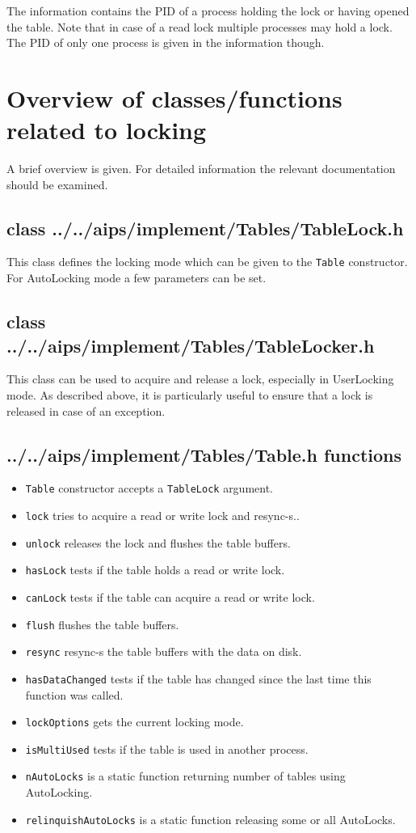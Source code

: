 The information contains the PID of a process holding the lock or
having opened the table. Note that in case of a read lock multiple
processes may hold a lock. The PID of only one process is given
in the information though.


\section{Overview of classes/functions related to locking}
A brief overview is given. For detailed information the relevant
documentation should be examined.

\subsection{class 
{../../aips/implement/Tables/TableLock.h}}
This class defines the locking mode which can be given to the \texttt{Table}
constructor. For AutoLocking mode a few parameters can be set.

\subsection{class 
{../../aips/implement/Tables/TableLocker.h}}
This class can be used to acquire and release a lock, especially in
UserLocking mode. As described above, it is particularly useful to ensure
that a lock is released in case of an exception.

\subsection{
{../../aips/implement/Tables/Table.h} functions}
\begin{itemize}
\item \texttt{Table} constructor accepts a \texttt{TableLock} argument.
\item \texttt{lock} tries to acquire a read or write lock and resync-s..
\item \texttt{unlock} releases the lock and flushes the table buffers.
\item \texttt{hasLock} tests if the table holds a read or write lock.
\item \texttt{canLock} tests if the table can acquire a read or write lock.
\item \texttt{flush} flushes the table buffers.
\item \texttt{resync} resync-s the table buffers with the data on disk.
\item \texttt{hasDataChanged} tests if the table has changed since the
last time this function was called.
\item \texttt{lockOptions} gets the current locking mode.
\item \texttt{isMultiUsed} tests if the table is used in another process.
\item \texttt{nAutoLocks} is a static function returning number of tables
using AutoLocking.
\item \texttt{relinquishAutoLocks} is a static function releasing some
or all AutoLocks.
\end{itemize}

